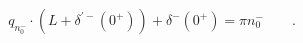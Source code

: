 \begin{equation}
q_{n_0^-}\cdot (L+\delta^{\prime -}(0^+))+\delta^-(0^+)=\pi
 n_0^- \qquad .
\end{equation}

